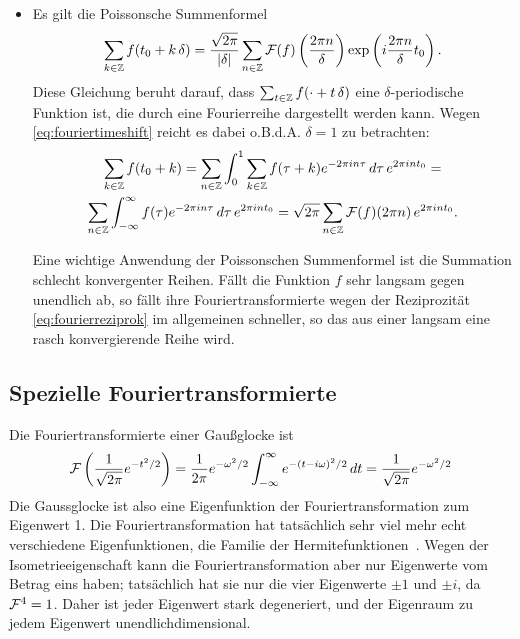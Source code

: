 \begin{itemize}
\item Es gilt die Poissonsche Summenformel
  \begin{equation}
    \label{eq:poissonsumme}
    \sum_{k\in\mathbb{Z}}f(t_0 + k\, \delta)=
    \frac{\sqrt{2\pi}}{|\delta|}\sum_{n\in\mathbb{Z}}\mathcal F(f)
    \left(\frac{2\pi n}{\delta}\right)
    \exp\left(i \frac{2\pi n}{\delta} t_0\right).
  \end{equation}
  Diese Gleichung beruht darauf, dass $\sum_{t\in\mathbb{Z}}f(\cdot + t\,
  \delta)$ eine $\delta$-periodische Funktion ist, die durch eine
  Fourierreihe dargestellt werden kann. Wegen
  \eqref{eq:fouriertimeshift} reicht es
  dabei o.B.d.A. $\delta=1$ zu
  betrachten:
  \begin{multline}
    \sum_{k\in\mathbb{Z}}f(t_0 + k) =
    \sum_{n\in\mathbb{Z}} \int_0^1 \sum_{k\in\mathbb{Z}}f(\tau + k)e^{-2\pi i
      n \tau}\, d\tau
    \, e^{2\pi i n t_0} =\\
    \sum_{n\in\mathbb{Z}} \int_{-\infty}^\infty f(\tau)e^{-2\pi i
      n \tau}\, d\tau
    \, e^{2\pi i n t_0}
    = \sqrt{2\pi}\sum_{n\in\mathbb{Z}}\mathcal F(f)(2\pi n)\, e^{2\pi i n t_0}.
  \end{multline}

  Eine wichtige Anwendung der Poissonschen Summenformel ist die
  Summation schlecht konvergenter Reihen. Fällt die Funktion $f$ sehr
  langsam gegen unendlich ab, so fällt ihre Fouriertransformierte
  wegen der Reziprozität \eqref{eq:fourierreziprok} im allgemeinen
  schneller, so das aus einer langsam eine rasch konvergierende Reihe
  wird.
\end{itemize}

\subsection{Spezielle Fouriertransformierte}

Die Fouriertransformierte einer Gaußglocke ist
\begin{equation}
  \mathcal F\left(\frac{1}{\sqrt{2\pi}}e^{-t^2/2}\right)
  =
  \frac{1}{2\pi}e^{-\omega^2/2}\int_{-\infty}^{\infty} e^{-(t-i\omega)^2/2}\, dt
  =
  \frac{1}{\sqrt{2\pi}}e^{-\omega^2/2}
\end{equation}
Die Gaussglocke ist also eine Eigenfunktion der Fouriertransformation
zum Eigenwert 1. Die Fouriertransformation hat tatsächlich sehr viel
mehr echt verschiedene Eigenfunktionen, die Familie der
Hermitefunktionen~\cite{pinsky02a}. Wegen der Isometrieeigenschaft kann die
Fouriertransformation aber nur Eigenwerte vom Betrag eins haben;
tatsächlich hat sie nur die vier Eigenwerte $\pm 1$ und $\pm i$, da
$\mathcal F^4=1$. Daher ist jeder Eigenwert stark degeneriert, und der
Eigenraum zu jedem Eigenwert unendlichdimensional.

